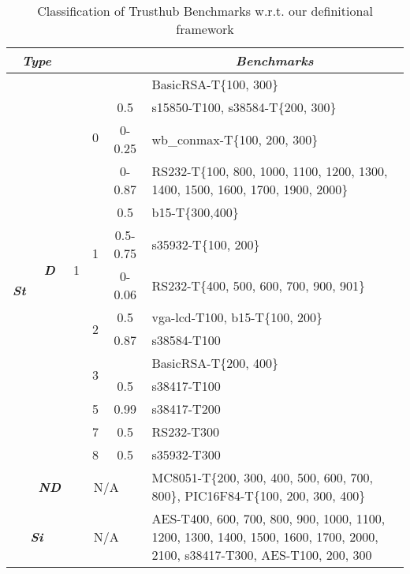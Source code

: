 \documentclass[10pt,journal,compsoc]{IEEEtran}
\begin{document}
\begin{table}[t]
\renewcommand{\arraystretch}{1.2}
\setlength\tabcolsep{2pt}
\centering
\caption{Classification of Trusthub Benchmarks w.r.t. our definitional framework}
\label{table:trusthub_table}
\begin{tabular}{|c|c|c|c|c||m{}|}\hline

\multicolumn{2}{|c|}{\multirow{1}{*}{\textit{\textbf{Type}}}}			&
\multicolumn{1}{c|}{\multirow{1}{*}{}}							&
\multicolumn{1}{c|}{\multirow{1}{*}{}}							&
\multicolumn{1}{c|}{\multirow{1}{*}{}}						&
\multicolumn{1}{c|}{\multirow{1}{*}{\textit{\textbf{Benchmarks}}}}	\\  \hline 

\multicolumn{1}{|c|}{\multirow{15}{*}{\textit{\textbf{St}}}}	&
\multicolumn{1}{c|}{\multirow{14}{*}{\textit{\textbf{D}}}}		&
\multicolumn{1}{c|}{\multirow{14}{*}{1}}		&
\multicolumn{1}{c|}{\multirow{4}{*}{0}}						&
       		& BasicRSA-T\{100, 300\} \\ \cline{5-6}
       
&&&& 0.5 	& 	s15850-T100, s38584-T\{200, 300\} \\ \cline{5-6}
&&&& 0-0.25	&	wb\_conmax-T\{100, 200, 300\} \\ \cline{5-6}
&&&& 0-0.87	&	RS232-T\{100, 800, 1000, 1100, 1200, 1300, 1400, 1500, 1600, 1700, 1900, 2000\} \\ \cline{4-6}

&&& \multicolumn{1}{c|}{\multirow{3}{*}{1}}		&
	0.5	&	b15-T\{300,400\}								\\ \cline{5-6}
&&&& 0.5-0.75  &	s35932-T\{100, 200\}						\\ \cline{5-6}
&&&& 0-0.06	  &	RS232-T\{400, 500, 600, 700, 900, 901\} \\ \cline{4-6}

&&& \multicolumn{1}{c|}{\multirow{2}{*}{2}}		&
	0.5		&	vga-lcd-T100, b15-T\{100, 200\}				\\ \cline{5-6}
&&&& 0.87	&	 s38584-T100 							\\ \cline{4-6}

&&& \multicolumn{1}{c|}{\multirow{2}{*}{3}}		&
		&	BasicRSA-T\{200, 400\}				\\ \cline{5-6}
&&&& 0.5			&	s38417-T100 						\\ \cline{4-6}

&&& 5	&	0.99&	 s38417-T200  \\ \cline{4-6}
&&& 7	&	0.5	&	RS232-T300 \\ \cline{4-6}
&&& 8 	&	0.5	&	s35932-T300 \\ \cline{2-6}


&
\multicolumn{1}{c|}{\textit{\textbf{ND}}}		&
\multicolumn{3}{c||}{ N/A }						&
MC8051-T\{200, 300, 400, 500, 600, 700, 800\}, PIC16F84-T\{100, 200, 300, 400\} \\ \hline

\multicolumn{2}{|c|}{\textit{\textbf{Si}}} 		& 
\multicolumn{3}{c||}{ N/A }						&
AES-T400, 600, 700, 800, 900, 1000, 1100, 1200, 1300, 1400, 1500, 1600, 1700, 2000, 2100, s38417-T300, AES-T100, 200, 300 \\ \hline 

\end{tabular}
\end{table}
\end{document}
